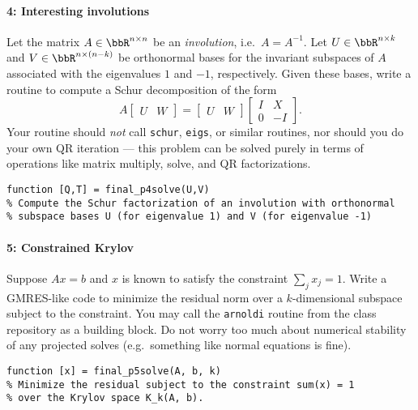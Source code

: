 \documentclass[12pt, leqno]{article} %
\begin{document}
\paragraph*{4: Interesting involutions}
Let the matrix $A \in \bbR^{n \times n}$ be an {\em involution},
i.e.~$A = A^{-1}$.  Let $U \in \bbR^{n \times k}$ and
$V \in \bbR^{n \times (n-k)}$ be orthonormal bases for the
invariant subspaces of $A$ associated with the eigenvalues $1$ and $-1$,
respectively.  Given these bases, write a routine to compute a
Schur decomposition of the form
\[
  A \begin{bmatrix} U & W \end{bmatrix} =
  \begin{bmatrix} U & W \end{bmatrix}
  \begin{bmatrix} I & X \\ 0 & -I \end{bmatrix}.
\]
Your routine should {\em not} call {\tt schur}, {\tt eigs}, or similar
routines, nor should you do your own QR iteration --- this problem can
be solved purely in terms of operations like matrix multiply, solve, and
QR factorizations.
\begin{lstlisting}
function [Q,T] = final_p4solve(U,V)
% Compute the Schur factorization of an involution with orthonormal
% subspace bases U (for eigenvalue 1) and V (for eigenvalue -1)
\end{lstlisting}

\paragraph*{5: Constrained Krylov}
Suppose $Ax = b$ and $x$ is known to satisfy the
constraint $\sum_j x_j = 1$.  Write a GMRES-like code to minimize
the residual norm over a $k$-dimensional subspace subject to
the constraint.  You may call the {\tt arnoldi}
routine from the class repository as a building block.  Do not
worry too much about numerical stability of any projected solves
(e.g.~something like normal equations is fine).
\begin{lstlisting}
function [x] = final_p5solve(A, b, k)
% Minimize the residual subject to the constraint sum(x) = 1
% over the Krylov space K_k(A, b).
\end{lstlisting}
\end{document}
